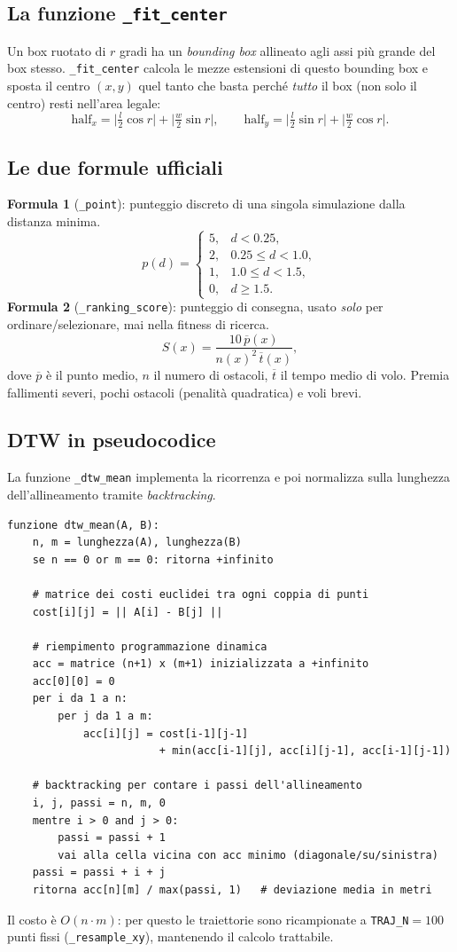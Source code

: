 \documentclass[11pt,a4paper]{report}
\newcommand{\code}[1]{\texttt{#1}}
\begin{document}
\subsection{La funzione \texttt{\_fit\_center}}
Un box ruotato di $r$ gradi ha un \emph{bounding box} allineato agli
assi più grande del box stesso. \code{\_fit\_center} calcola le mezze
estensioni di questo bounding box e sposta il centro $(x,y)$ quel tanto
che basta perché \emph{tutto} il box (non solo il centro) resti nell'area
legale:
\[
\text{half}_x = \Big|\tfrac{l}{2}\cos r\Big| + \Big|\tfrac{w}{2}\sin r\Big|,
\qquad
\text{half}_y = \Big|\tfrac{l}{2}\sin r\Big| + \Big|\tfrac{w}{2}\cos r\Big|.
\]

\subsection{Le due formule ufficiali}
\textbf{Formula 1} (\code{\_point}): punteggio discreto di una singola
simulazione dalla distanza minima.
\[
p(d)=
\begin{cases}
5, & d<0.25,\\
2, & 0.25\le d<1.0,\\
1, & 1.0\le d<1.5,\\
0, & d\ge 1.5.
\end{cases}
\]
\textbf{Formula 2} (\code{\_ranking\_score}): punteggio di consegna,
usato \emph{solo} per ordinare/selezionare, mai nella fitness di ricerca.
\[
S(x)=\frac{10\,\overline{p}(x)}{n(x)^2\,\overline{t}(x)},
\]
dove $\overline{p}$ è il punto medio, $n$ il numero di ostacoli,
$\overline{t}$ il tempo medio di volo. Premia fallimenti severi, pochi
ostacoli (penalità quadratica) e voli brevi.

\subsection{DTW in pseudocodice}
La funzione \code{\_dtw\_mean} implementa la ricorrenza e poi normalizza
sulla lunghezza dell'allineamento tramite \emph{backtracking}.
\begin{lstlisting}[style=pseudo]
funzione dtw_mean(A, B):
    n, m = lunghezza(A), lunghezza(B)
    se n == 0 or m == 0: ritorna +infinito

    # matrice dei costi euclidei tra ogni coppia di punti
    cost[i][j] = || A[i] - B[j] ||

    # riempimento programmazione dinamica
    acc = matrice (n+1) x (m+1) inizializzata a +infinito
    acc[0][0] = 0
    per i da 1 a n:
        per j da 1 a m:
            acc[i][j] = cost[i-1][j-1]
                        + min(acc[i-1][j], acc[i][j-1], acc[i-1][j-1])

    # backtracking per contare i passi dell'allineamento
    i, j, passi = n, m, 0
    mentre i > 0 and j > 0:
        passi = passi + 1
        vai alla cella vicina con acc minimo (diagonale/su/sinistra)
    passi = passi + i + j
    ritorna acc[n][m] / max(passi, 1)   # deviazione media in metri
\end{lstlisting}
Il costo è $O(n\cdot m)$: per questo le traiettorie sono ricampionate a
\code{TRAJ\_N}$=100$ punti fissi (\code{\_resample\_xy}), mantenendo il
calcolo trattabile.
\end{document}
